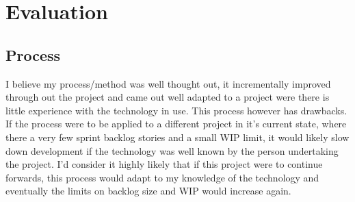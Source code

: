 \chapter{Evaluation}





\section{Process}
I believe my process/method was well thought out, it incrementally improved through out the project and came out well adapted to a project were there is little experience with the technology in use. This process however has drawbacks. If the process were to be applied to a different project in it's current state, where there a very few sprint backlog stories and a small WIP limit, it would likely slow down development if the technology was well known by the person undertaking the project. I'd consider it highly likely that if this project were to continue forwards, this process would adapt to my knowledge of the technology and eventually the limits on backlog size and WIP would increase again.

